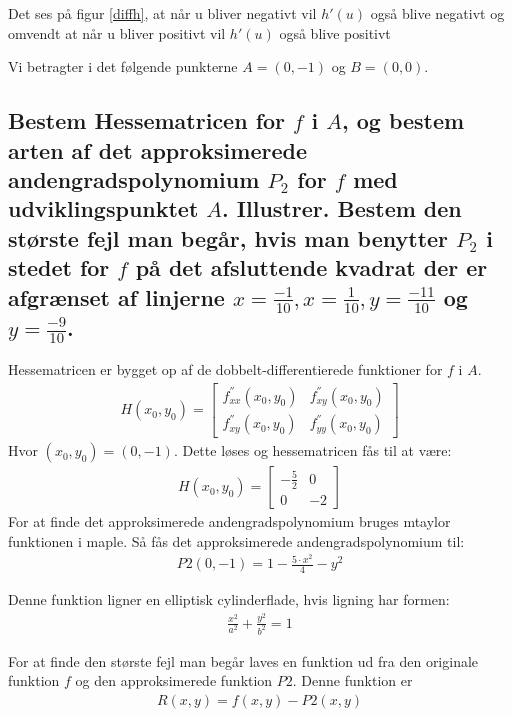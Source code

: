 Det ses på figur \ref{diffh}, at når u bliver negativt vil $h'(u)$ også blive negativt og omvendt at når u bliver positivt vil $h'(u)$ også blive positivt


Vi betragter i det følgende punkterne $A = (0,-1)$ og $B=(0,0)$.

\subsection{Bestem Hessematricen for $f$ i $A$, og bestem arten af det approksimerede andengradspolynomium $P_2$ for $f$ med udviklingspunktet $A$. Illustrer. Bestem den største fejl man begår, hvis man benytter $P_2$ i stedet for $f$ på det afsluttende kvadrat der er afgrænset af linjerne $x=\frac{-1}{10},x=\frac{1}{10},y=\frac{-11}{10}$ og $y=\frac{-9}{10}$.}

Hessematricen er bygget op af de dobbelt-differentierede funktioner for $f$ i $A$. 
\begin{align}
    H(x_0,y_0)= 
    \left[
    \begin{array}{cc}
        f^{''}_{xx}(x_0,y_0) & f^{''}_{xy}(x_0,y_0)\\f^{''}_{xy}(x_0,y_0) & f^{''}_{yy}(x_0,y_0)
    \end{array}
\right] 
\end{align}
Hvor $(x_0,y_0)=(0,-1)$.
Dette løses og hessematricen fås til at være:
\begin{align}
    H(x_0,y_0)= 
    \left[
    \begin{array}{cc}
        -\frac{5}{2} & 0\\0 & -2
    \end{array}
\right] 
\end{align}
For at finde det approksimerede andengradspolynomium bruges mtaylor funktionen i maple. Så fås det approksimerede andengradspolynomium til:
\begin{align}
    P2(0,-1) = 1-\frac{5\cdot x^2}{4} - y^2
\end{align}

Denne funktion ligner en elliptisk cylinderflade, hvis ligning har formen:
\begin{align}
    \frac{x^2}{a^2} + \frac{y^2}{b^2} = 1
\end{align}

For at finde den største fejl man begår laves en funktion ud fra den originale funktion $f$ og den approksimerede funktion $P2$. Denne funktion er
\begin{align}
    R(x,y) = f(x,y)-P2(x,y)
\end{align}

